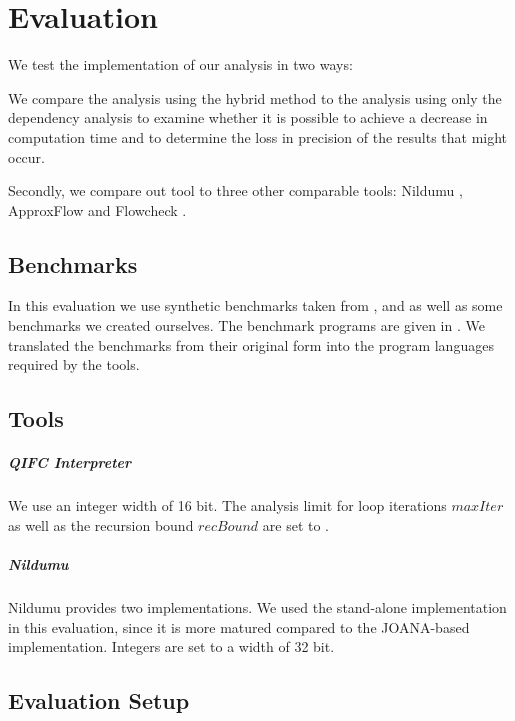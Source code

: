 \chapter{Evaluation}\label{sec:eval}
We test the implementation of our analysis in two ways:

We compare the analysis using the hybrid method to the analysis using only the dependency analysis to examine whether it is possible to achieve a decrease in computation time and to determine the loss in precision of the results that might occur.

Secondly, we compare out tool to three other comparable tools: Nildumu \cite{bechberger18}, ApproxFlow \cite{biondi18} and Flowcheck \cite{mccamant08}.

\section{Benchmarks}
In this evaluation we use synthetic benchmarks taken from \cite{biondi15}, \cite{backes09} and \cite{meng11} as well as some benchmarks we created ourselves. The benchmark programs are given in . We translated the benchmarks from their original form into the program languages required by the tools.

\section{Tools}

\paragraph{QIFC Interpreter}
We use an integer width of 16 bit. The analysis limit for loop iterations $maxIter$ as well as the recursion bound $recBound$ are set to .

\paragraph{Nildumu}
Nildumu provides two implementations. We used the stand-alone implementation in this evaluation, since it is more matured compared to the JOANA-based implementation. Integers are set to a width of 32 bit.

\section{Evaluation Setup}

